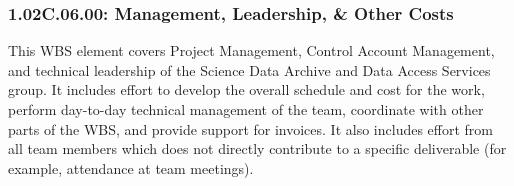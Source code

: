 \subsubsection*{1.02C.06.00: Management, Leadership, \& Other Costs}

This WBS element covers Project Management, Control Account Management, and
technical leadership of the Science Data Archive and Data Access Services
group. It includes effort to develop the overall schedule and cost for the
work, perform day-to-day technical management of the team, coordinate with
other parts of the WBS, and provide support for invoices. It also includes
effort from all team members which does not directly contribute to a specific
deliverable (for example, attendance at team meetings).
